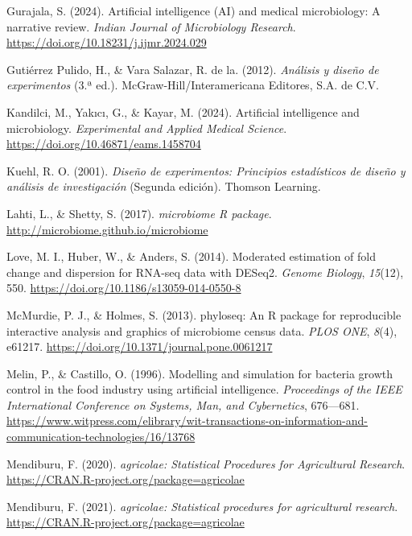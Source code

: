 \documentclass[
  spanish,
  letterpaper,
  DIV=11,
  numbers=noendperiod]{scrreprt}
\newlength{\cslhangindent}
\newenvironment{CSLReferences}[2] %
 {\begin{list}{}{%
  \setlength{\itemindent}{0pt}
  \setlength{\leftmargin}{0pt}
  \setlength{\parsep}{0pt}
  \ifodd #1
   \setlength{\leftmargin}{\cslhangindent}
   \setlength{\itemindent}{-1\cslhangindent}
  \fi
  \setlength{\itemsep}{#2\baselineskip}}}
 {\end{list}}
\begin{document}
\begin{CSLReferences}{1}{0}
Gurajala, S. (2024). Artificial intelligence (AI) and medical
microbiology: A narrative review. \emph{Indian Journal of Microbiology
Research}. \url{https://doi.org/10.18231/j.ijmr.2024.029}

Gutiérrez Pulido, H., \& Vara Salazar, R. de la. (2012).
\emph{An{á}lisis y dise{ñ}o de experimentos} (3.ª ed.).
McGraw-Hill/Interamericana Editores, S.A. de C.V.

Kandilci, M., Yakıcı, G., \& Kayar, M. (2024). Artificial intelligence
and microbiology. \emph{Experimental and Applied Medical Science}.
\url{https://doi.org/10.46871/eams.1458704}

Kuehl, R. O. (2001). \emph{Diseño de experimentos: Principios
estadísticos de diseño y análisis de investigación} (Segunda edición).
Thomson Learning.

Lahti, L., \& Shetty, S. (2017). \emph{{microbiome R package}}.
\url{http://microbiome.github.io/microbiome}

Love, M. I., Huber, W., \& Anders, S. (2014). {Moderated estimation of
fold change and dispersion for RNA-seq data with DESeq2}. \emph{Genome
Biology}, \emph{15}(12), 550.
\url{https://doi.org/10.1186/s13059-014-0550-8}

McMurdie, P. J., \& Holmes, S. (2013). {phyloseq: An R package for
reproducible interactive analysis and graphics of microbiome census
data}. \emph{PLOS ONE}, \emph{8}(4), e61217.
\url{https://doi.org/10.1371/journal.pone.0061217}

Melin, P., \& Castillo, O. (1996). Modelling and simulation for bacteria
growth control in the food industry using artificial intelligence.
\emph{Proceedings of the IEEE International Conference on Systems, Man,
and Cybernetics}, 676---681.
\url{https://www.witpress.com/elibrary/wit-transactions-on-information-and-communication-technologies/16/13768}

Mendiburu, F. (2020). \emph{agricolae: Statistical Procedures for
Agricultural Research}.
\url{https://CRAN.R-project.org/package=agricolae}

Mendiburu, F. (2021). \emph{{agricolae: Statistical procedures for
agricultural research}}.
\url{https://CRAN.R-project.org/package=agricolae}


\end{CSLReferences}
\end{document}
